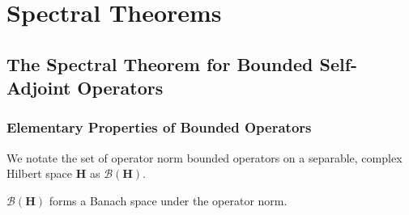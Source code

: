 \section{Spectral Theorems}\label{sctn:spectral-theorems}


\subsection{The Spectral Theorem for Bounded Self-Adjoint Operators}

\subsubsection{Elementary Properties of Bounded Operators}

\begin{definition}
    \label{def:bounded-operator-notation}
    We notate the set of operator norm bounded operators on a separable, complex Hilbert space $\mathbf{H}$ as $\mathcal{B}(\mathbf{H})$.
\end{definition}

\begin{lemma}
    \label{lmm:bounded-operators-form-a-banach-space}
    $\mathcal{B}(\mathbf{H})$ forms a Banach space under the operator norm.
\end{lemma}

